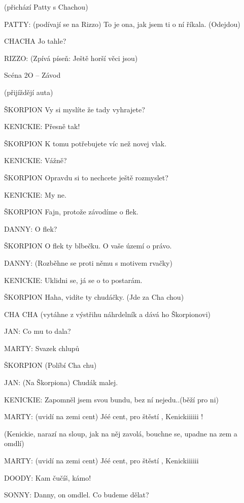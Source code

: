 (přichází Patty s Chachou) 

\rep PATTY:        (podívají se na Rizzo) To je ona, jak jsem ti o ní říkala. (Odejdou)

CHACHA            Jo tahle?

\rep RIZZO:        (Zpívá píseň: Ještě horší věci jsou) 

Scéna 2O  – Závod 

(přijíždějí auta) 

ŠKORPION        Vy si myslíte že tady vyhrajete?

\rep KENICKIE:        Přesně tak! 

ŠKORPION        K tomu potřebujete víc než novej vlak. 

\rep KENICKIE:        Vážně?

ŠKORPION        Opravdu si to nechcete ještě rozmyslet?

\rep KENICKIE:        My ne.

ŠKORPION        Fajn, protože závodíme o flek. 

\rep DANNY:        O flek? 

ŠKORPION        O flek ty blbečku. O vaše území o právo. 

\rep DANNY:        (Rozběhne se proti němu s motivem rvačky) 

\rep KENICKIE:        Uklidni se, já se o to postarám. 

ŠKORPION        Haha, vidíte ty chudáčky. (Jde za Cha chou) 

CHA CHA        (vytáhne z výstřihu náhrdelník a dává ho Škorpionovi)

\rep JAN:        Co mu to dala?

\rep MARTY:        Svazek chlupů

ŠKORPION        (Políbí Cha chu)

\rep JAN:        (Na Škorpiona) Chudák malej. 

\rep KENICKIE:            Zapomněl jsem svou bundu, bez ní nejedu..(běží pro ni)

\rep MARTY: (uvidí na zemi cent)  Jéé cent,  pro štěstí , Kenickiiiiii !

(Kenickie, narazí na sloup, jak na něj zavolá, bouchne se, upadne na zem a omdlí)

\rep MARTY: (uvidí na zemi cent)  Jéé cent,  pro štěstí , Kenickiiiiii

\rep DOODY:        Kam čučíš, kámo!

\rep SONNY:        Danny,  on omdlel. Co budeme dělat? 

